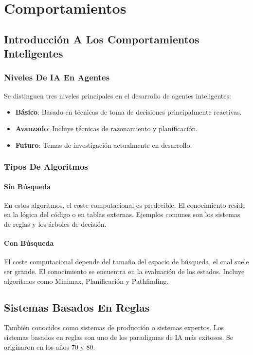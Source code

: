 \chapter{Comportamientos}

\section{Introducción A Los Comportamientos Inteligentes}
\subsection{Niveles De IA En Agentes}
Se distinguen tres niveles principales en el desarrollo de agentes inteligentes:
\begin{itemize}
    \item \textbf{Básico}: Basado en técnicas de toma de decisiones principalmente reactivas.
    \item \textbf{Avanzado}: Incluye técnicas de razonamiento y planificación.
    \item \textbf{Futuro}: Temas de investigación actualmente en desarrollo.
\end{itemize}

\subsection{Tipos De Algoritmos}
\subsubsection{Sin Búsqueda}
En estos algoritmos, el coste computacional es predecible. El conocimiento reside en la lógica del código o en tablas externas. Ejemplos comunes son los sistemas de reglas y los árboles de decisión.

\subsubsection{Con Búsqueda}
El coste computacional depende del tamaño del espacio de búsqueda, el cual suele ser grande. El conocimiento se encuentra en la evaluación de los estados. Incluye algoritmos como Minimax, Planificación y Pathfinding.


\section{Sistemas Basados En Reglas}
También conocidos como sistemas de producción o sistemas expertos. Los sistemas basados en reglas son uno de los paradigmas de IA más
exitosos. Se originaron en los años 70 y 80.

